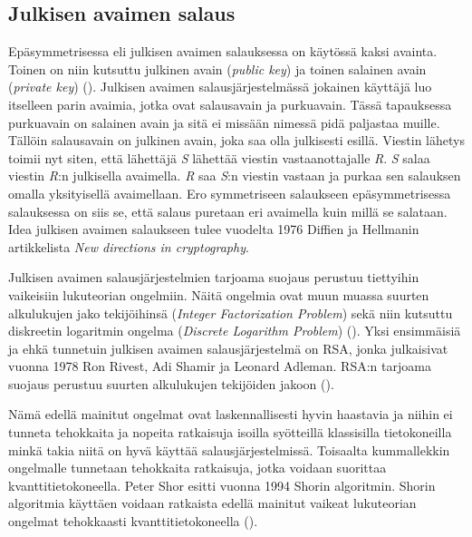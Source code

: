 \subsection{Julkisen avaimen salaus}
 Epäsymmetrisessa eli julkisen avaimen salauksessa on käytössä kaksi avainta. Toinen on niin kutsuttu julkinen avain (\emph{public key}) ja toinen salainen avain (\emph{private key}) (\cite{bellare2005introduction}). Julkisen avaimen salausjärjestelmässä jokainen käyttäjä luo itselleen parin avaimia, jotka ovat salausavain ja purkuavain. Tässä tapauksessa purkuavain on salainen avain ja sitä ei missään nimessä pidä paljastaa muille. Tällöin salausavain on julkinen avain, joka saa olla julkisesti esillä. Viestin lähetys toimii nyt siten, että lähettäjä \emph{S} lähettää viestin vastaanottajalle \emph{R}. \emph{S} salaa viestin \emph{R}:n julkisella avaimella. \emph{R} saa \emph{S}:n viestin vastaan ja purkaa sen salauksen omalla yksityisellä avaimellaan. Ero symmetriseen salaukseen epäsymmetrisessa salauksessa on siis se, että salaus puretaan eri avaimella kuin millä se salataan. Idea julkisen avaimen salaukseen tulee vuodelta 1976 Diffien ja Hellmanin artikkelista \emph{New directions in cryptography}.
 
  Julkisen avaimen salausjärjestelmien tarjoama suojaus perustuu tiettyihin vaikeisiin lukuteorian ongelmiin. Näitä ongelmia ovat muun muassa suurten alkulukujen jako tekijöihinsä (\emph{Integer Factorization Problem}) sekä niin kutsuttu diskreetin logaritmin ongelma (\emph{Discrete Logarithm Problem}) (\cite{10.1007/978-3-319-11659-4_15}).  Yksi ensimmäisiä ja ehkä tunnetuin julkisen avaimen salausjärjestelmä on RSA, jonka julkaisivat vuonna 1978 Ron Rivest, Adi Shamir ja Leonard Adleman. RSA:n tarjoama suojaus perustuu suurten alkulukujen tekijöiden jakoon (\cite{bellare2005introduction}).
 
 Nämä edellä mainitut ongelmat ovat laskennallisesti hyvin haastavia ja niihin ei tunneta tehokkaita ja nopeita ratkaisuja isoilla syötteillä klassisilla tietokoneilla minkä takia niitä on hyvä käyttää salausjärjestelmissä. Toisaalta kummallekkin ongelmalle tunnetaan tehokkaita ratkaisuja, jotka voidaan suorittaa kvanttitietokoneella. Peter Shor esitti vuonna 1994 Shorin algoritmin. Shorin algoritmia käyttäen voidaan ratkaista edellä mainitut vaikeat lukuteorian ongelmat tehokkaasti kvanttitietokoneella (\cite{10.1007/978-3-319-11659-4_15}).
 
